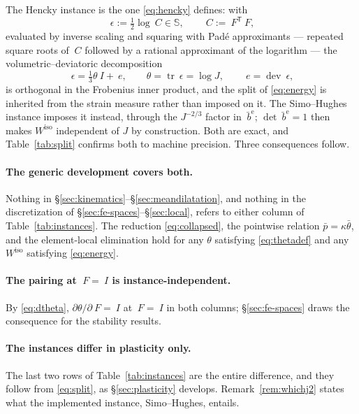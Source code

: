 \documentclass[11pt]{article}
\newcommand{\F}{~F}
\newcommand{\C}{~C}
\newcommand{\Id}{~I}
\newcommand{\eps}{~\epsilon}
\newcommand{\edev}{~e}
\newcommand{\Syms}{\mathbb{S}}
\newcommand{\dev}{\operatorname{dev}}
\newcommand{\trace}{\operatorname{tr}}
\newcommand{\transpose}[1]{#1^{\mathsf{T}}}
\newcommand{\supiso}{^{\mathrm{iso}}}
\theoremstyle{definition}
\theoremstyle{plain}
\begin{document}
The Hencky instance is the one \eqref{eq:hencky} defines: with
\begin{equation}
  \label{eq:hencky}
  \eps := \tfrac{1}{2}\log\C \in \Syms,
  \qquad \C := \transpose{\F}\F,
\end{equation}
evaluated by inverse scaling and squaring with Pad\'e approximants --- repeated
square roots of $\C$ followed by a rational approximant of the logarithm
\citep{AlMohy.Higham.Relton:2013} --- the
volumetric--deviatoric decomposition
\begin{equation}
  \label{eq:split}
  \eps = \tfrac{1}{3}\theta\Id + \edev,
  \qquad \theta = \trace\eps = \log J,
  \qquad \edev = \dev\eps,
\end{equation}
is orthogonal in the Frobenius inner product, and the split of
\eqref{eq:energy} is inherited from the strain measure rather than imposed on
it. The Simo--Hughes instance imposes it instead, through the $J^{-2/3}$ factor
in $\bar{~b}^{\mathrm e}$; $\det\bar{~b}^{\mathrm e} = 1$ then makes
$W\supiso$ independent of $J$ by construction. Both are exact, and
Table~\ref{tab:split} confirms both to machine precision. Three consequences
follow.

\paragraph{The generic development covers both.} Nothing in
\S\ref{sec:kinematics}--\S\ref{sec:meandilatation}, and nothing in the
discretization of \S\ref{sec:fe-spaces}--\S\ref{sec:local}, refers to either
column of Table~\ref{tab:instances}. The reduction \eqref{eq:collapsed}, the
pointwise relation $\bar p = \kappa\bar\theta$, and the element-local
elimination hold for any $\theta$ satisfying \eqref{eq:thetadef} and any
$W\supiso$ satisfying \eqref{eq:energy}.

\paragraph{The pairing at $\F = \Id$ is instance-independent.} By
\eqref{eq:dtheta}, $\partial\theta/\partial\F = \Id$ at $\F = \Id$ in both
columns; \S\ref{sec:fe-spaces} draws the consequence for the stability
results.

\paragraph{The instances differ in plasticity only.} The last two rows of
Table~\ref{tab:instances} are the entire difference, and they follow from
\eqref{eq:split}, as \S\ref{sec:plasticity} develops. Remark~\ref{rem:whichj2}
states what the implemented instance, Simo--Hughes, entails.
\end{document}
